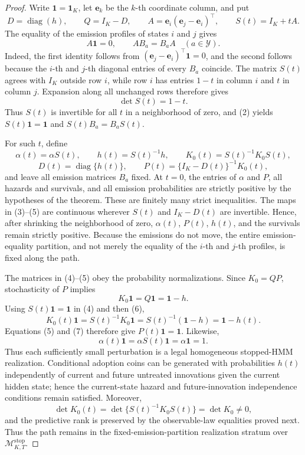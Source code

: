 \documentclass{article}
\begin{document}
\begin{proof}
Write \(\mathbf 1=\mathbf 1_K\), let \(\mathbf e_k\) be the \(k\)-th coordinate column, and put
\[
 D=\operatorname{diag}(h),\qquad Q=I_K-D,\qquad
 A=\mathbf e_i(\mathbf e_j-\mathbf e_i)^{\top},\qquad
 S(t)=I_K+tA.                                                   \tag{1}
\]
The equality of the emission profiles of states \(i\) and \(j\) gives
\[
 A\mathbf 1=0,\qquad AB_a=B_aA\quad(a\in\mathcal Y).         \tag{2}
\]
Indeed, the first identity follows from \((\mathbf e_j-\mathbf e_i)^{\top}\mathbf 1=0\), and the second follows because the \(i\)-th and \(j\)-th diagonal entries of every \(B_a\) coincide. The matrix \(S(t)\) agrees with \(I_K\) outside row \(i\), while row \(i\) has entries \(1-t\) in column \(i\) and \(t\) in column \(j\). Expansion along all unchanged rows therefore gives
\[
 \det S(t)=1-t.                                                 \tag{3}
\]
Thus \(S(t)\) is invertible for all \(t\) in a neighborhood of zero, and (2) yields \(S(t)\mathbf 1=\mathbf 1\) and \(S(t)B_a=B_aS(t)\).

For such \(t\), define
\[
 \alpha(t)=\alpha S(t),\qquad h(t)=S(t)^{-1}h,\qquad
 K_0(t)=S(t)^{-1}K_0S(t),                                      \tag{4}
\]
\[
 D(t)=\operatorname{diag}\{h(t)\},\qquad
 P(t)=\{I_K-D(t)\}^{-1}K_0(t),                                \tag{5}
\]
and leave all emission matrices \(B_a\) fixed. At \(t=0\), the entries of \(\alpha\) and \(P\), all hazards and survivals, and all emission probabilities are strictly positive by the hypotheses of the theorem. These are finitely many strict inequalities. The maps in (3)--(5) are continuous wherever \(S(t)\) and \(I_K-D(t)\) are invertible. Hence, after shrinking the neighborhood of zero, \(\alpha(t)\), \(P(t)\), \(h(t)\), and the survivals remain strictly positive. Because the emissions do not move, the entire emission-equality partition, and not merely the equality of the \(i\)-th and \(j\)-th profiles, is fixed along the path.

The matrices in (4)--(5) obey the probability normalizations. Since \(K_0=QP\), stochasticity of \(P\) implies
\[
 K_0\mathbf 1=Q\mathbf 1=\mathbf 1-h.                         \tag{6}
\]
Using \(S(t)\mathbf 1=\mathbf 1\) in (4) and then (6),
\[
 K_0(t)\mathbf 1
 =S(t)^{-1}K_0\mathbf 1
 =S(t)^{-1}(\mathbf 1-h)
 =\mathbf 1-h(t).                                               \tag{7}
\]
Equations (5) and (7) therefore give \(P(t)\mathbf 1=\mathbf 1\). Likewise,
\[
 \alpha(t)\mathbf 1=\alpha S(t)\mathbf 1=\alpha\mathbf 1=1. \tag{8}
\]
Thus each sufficiently small perturbation is a legal homogeneous stopped-HMM realization. Conditional adoption coins can be generated with probabilities \(h(t)\) independently of current and future untreated innovations given the current hidden state; hence the current-state hazard and future-innovation independence conditions remain satisfied. Moreover,
\[
 \det K_0(t)=\det\{S(t)^{-1}K_0S(t)\}=\det K_0\ne0,          \tag{9}
\]
and the predictive rank is preserved by the observable-law equalities proved next. Thus the path remains in the fixed-emission-partition realization stratum over \(\mathcal M^{\mathrm{stop}}_{K,T}\).


\end{proof}
\end{document}
